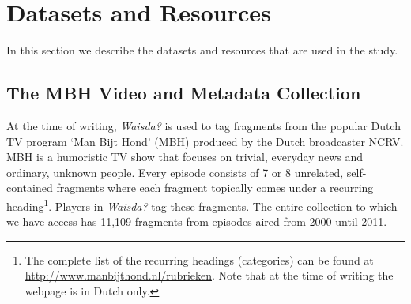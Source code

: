 
\section{Datasets and Resources}\label{ecir:sec:materials}
In this section we describe the datasets and resources that are used in the study.
\subsection{The MBH Video and Metadata Collection}\label{sec:video-metadata-collection}
At the time of writing, \textit{Waisda?} is used to %
tag fragments from the popular Dutch TV program `Man Bijt Hond' (MBH) produced by the Dutch broadcaster NCRV.  MBH is a humoristic TV show that focuses on trivial, everyday news and ordinary, unknown people.  Every episode consists of 7 or 8 unrelated, self-contained fragments where each fragment topically comes under a recurring heading\footnote{The complete list of the recurring headings (categories) can be found at \url{http://www.manbijthond.nl/rubrieken}. Note that at the time of writing the webpage is in Dutch only.}. Players in \textit{Waisda?} tag these fragments.  The entire collection to which we have access has 11,109 fragments from episodes aired from 2000 until 2011.

